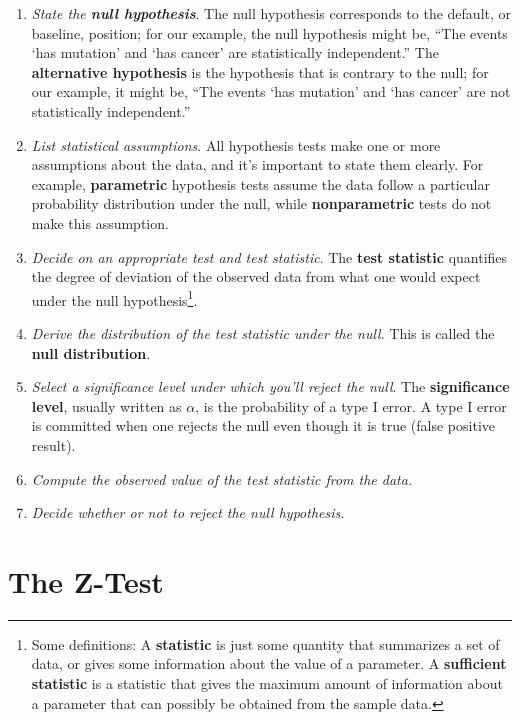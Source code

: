 \begin{enumerate}
\item \textit{State the \textbf{null hypothesis}}. The null hypothesis corresponds to the default, or baseline, position; for our example, the null hypothesis might be, ``The events `has mutation' and `has cancer' are statistically independent.'' The \textbf{alternative hypothesis} is the hypothesis that is contrary to the null; for our example, it might be, ``The events `has mutation' and `has cancer' are not statistically independent.''
\item \textit{List statistical {assumptions}}. All hypothesis tests make one or more assumptions about the data, and it's important to state them clearly. For example, \textbf{parametric} hypothesis tests assume the data follow a particular probability distribution under the null, while \textbf{nonparametric} tests do not make this assumption.
\item \textit{Decide on an appropriate test and test statistic}. The \textbf{test statistic} quantifies the degree of deviation of the observed data from what one would expect under the null hypothesis\footnote{Some definitions: A \textbf{statistic} is just some quantity that summarizes a set of data, or gives some information about the value of a parameter. A \textbf{sufficient statistic} is a statistic that gives the maximum amount of information about a parameter that can possibly be obtained from the sample data.}. 
\item \textit{Derive the distribution of the test statistic under the null}. This is called the \textbf{null distribution}.
\item \textit{Select a {significance level} under which you'll reject the null}. The \textbf{significance level}, usually written as $\alpha$, is the probability of a type I error. A type I error is committed when one rejects the null even though it is true (false positive result). 
\item \textit{Compute the observed value of the test statistic from the data.}
\item \textit{Decide whether or not to reject the null hypothesis.}
\end{enumerate}


\section{The Z-Test}

